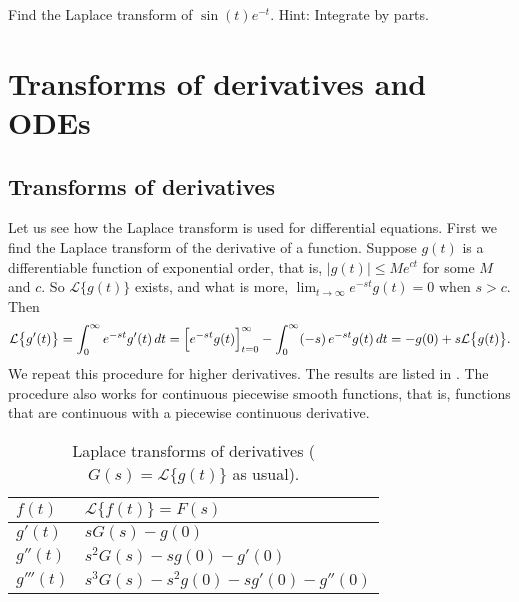 \begin{exercise}
Find the Laplace transform of $\sin(t)e^{-t}$.  Hint: Integrate by parts.
\end{exercise}



\sectionnewpage
\section{Transforms of derivatives and ODEs}
\label{transformsofders:section}



\subsection{Transforms of derivatives}

Let us see how the Laplace transform is used for differential equations.
First we find the Laplace transform of the derivative of a function.
Suppose $g(t)$ is a differentiable function
of exponential order, that is, $\lvert g(t) \rvert \leq M e^{ct}$ for some
$M$ and $c$.  So $\mathcal{L} \bigl\{ g(t) \bigr\}$ exists, and what is more,
$\lim_{t\to\infty} e^{-st}g(t) = 0$ when $s > c$.  Then
\begin{equation*}
\mathcal{L} \bigl\{ g'(t) \bigr\}
=
\int_0^\infty
e^{-st}
g'(t) \,dt
=
\Bigl[e^{-st} g(t) \Bigr]_{t=0}^\infty
-
\int_0^\infty
(-s)\,
e^{-st}
g(t) \,dt
=
-g(0) + s \mathcal{L} \bigl\{ g(t) \bigr\} .
\end{equation*}
We repeat this procedure for higher derivatives.
The results are
listed in .  The procedure also works for continuous piecewise
smooth functions, that is, functions that are continuous with a
piecewise continuous derivative.

\begin{table}[h!t]
\mybeginframe
\capstart
\begin{center}
\begin{tabular}{@{}ll@{}}
\toprule
$f(t)$ & $\mathcal{L} \bigl\{ f(t) \bigr\} = F(s)$ \\
\midrule
$g'(t)$ & $sG(s)-g(0)$ \\[4pt]
$g''(t)$ & $s^2G(s)-sg(0)-g'(0)$ \\[4pt]
$g'''(t)$ & $s^3G(s)-s^2g(0)-sg'(0)-g''(0)$ \\[4pt]
\bottomrule
\end{tabular}
\end{center}
\caption{Laplace transforms of derivatives
($G(s) = \mathcal{L} \bigl\{ g(t) \bigr\}$
as usual).\label{ltd:table}}
\myendframe
\end{table}

